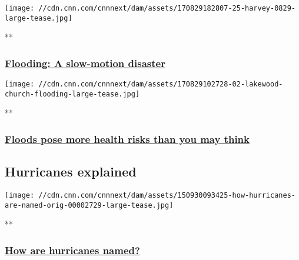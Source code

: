 \href{/videos/weather/2017/08/30/orig-weather-explainer-javaheri.cnn}{}

\texttt{[image: //cdn.cnn.com/cnnnext/dam/assets/170829182807-25-harvey-0829-large-tease.jpg]}

**

\hypertarget{flooding-a-slow-motion-disaster}{%
\subsubsection{\texorpdfstring{\href{/videos/weather/2017/08/30/orig-weather-explainer-javaheri.cnn}{Flooding:
A slow-motion
disaster}}{Flooding: A slow-motion disaster}}\label{flooding-a-slow-motion-disaster}}

\href{/videos/health/2017/08/30/dangers-of-flooding-lon-orig.cnn}{}

\texttt{[image: //cdn.cnn.com/cnnnext/dam/assets/170829102728-02-lakewood-church-flooding-large-tease.jpg]}

**

\hypertarget{floods-pose-more-health-risks-than-you-may-think}{%
\subsubsection{\texorpdfstring{\href{/videos/health/2017/08/30/dangers-of-flooding-lon-orig.cnn}{Floods
pose more health risks than you may
think}}{Floods pose more health risks than you may think}}\label{floods-pose-more-health-risks-than-you-may-think}}

\hypertarget{hurricanes-explained}{%
\subsection{Hurricanes explained}\label{hurricanes-explained}}

\href{/videos/us/2015/09/30/how-hurricanes-are-named-orig.cnn}{}

\texttt{[image: //cdn.cnn.com/cnnnext/dam/assets/150930093425-how-hurricanes-are-named-orig-00002729-large-tease.jpg]}

**

\hypertarget{how-are-hurricanes-named-}{%
\subsubsection{\texorpdfstring{\href{/videos/us/2015/09/30/how-hurricanes-are-named-orig.cnn}{How
are hurricanes named?
}}{How are hurricanes named? }}\label{how-are-hurricanes-named-}}

